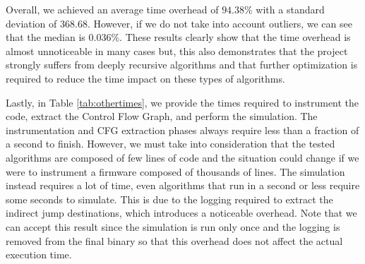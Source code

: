 Overall, we achieved an average time overhead of $94.38\%$ with a standard deviation
of $368.68$. However, if we do not take into account outliers, we can see that
the median is $0.036\%$. These results clearly show that the time overhead is almost
unnoticeable in many cases but, this also demonstrates that the project strongly
suffers from deeply recursive algorithms and that further optimization is
required to reduce the time impact on these types of algorithms.

Lastly, in Table \ref{tab:othertimes}, we provide the times required to
instrument the code, extract the Control Flow Graph, and perform the simulation.
The instrumentation and CFG extraction phases always require less than a fraction
of a second to finish. However, we must take into consideration that the tested algorithms
are composed of few lines of code and the situation could change if we were to instrument
a firmware composed of thousands of lines. The simulation instead requires a lot
of time, even algorithms that run in a second or less require some seconds to simulate.
This is due to the logging required to extract the indirect jump destinations, which
introduces a noticeable overhead. Note that we can accept this result since the
simulation is run only once and the logging is removed from the final binary so
that this overhead does not affect the actual execution time.

